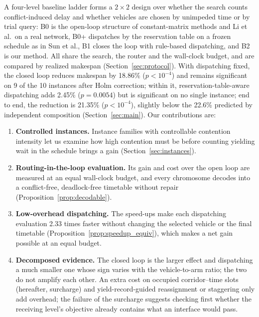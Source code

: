 \documentclass[preprint,review,12pt,authoryear,doubleblind]{elsarticle}
\newcommand{\NCases}{10}
\newcommand{\GainLoopRule}{18.86\%}      %
\newcommand{\PLoopRule}{<10^{-4}}
\newcommand{\GainProbeLoop}{2.45\%}      %
\newcommand{\PProbeLoop}{=0.0054}
\newcommand{\GainEndToEnd}{21.35\%}      %
\newcommand{\PEndToEnd}{<10^{-4}}
\newcommand{\GainIndepProduct}{22.6\%}
\newcommand{\CellsSigLoopAdj}{9}
\newcommand{\SpeedupProbe}{2.33}
\begin{document}
A four-level baseline ladder forms a $2\times2$ design over whether the search counts conflict-induced delay and whether vehicles are chosen by unimpeded time or by trial query: B0 is the open-loop structure of constant-matrix methods and Li et al.\ on a real network, B0+ dispatches by the reservation table on a frozen schedule as in Sun et al., B1 closes the loop with rule-based dispatching, and B2 is our method.
All share the search, the router and the wall-clock budget, and are compared by realized makespan (Section~\ref{sec:protocol}).
With dispatching fixed, the closed loop reduces makespan by \GainLoopRule{} ($p\PLoopRule$) and remains significant on \CellsSigLoopAdj{} of the \NCases{} instances after Holm correction; within it, reservation-table-aware dispatching adds \GainProbeLoop{} ($p\PProbeLoop$) but is significant on no single instance; end to end, the reduction is \GainEndToEnd{} ($p\PEndToEnd$), slightly below the \GainIndepProduct{} predicted by independent composition (Section~\ref{sec:main}).
Our contributions are:

\begin{enumerate}[leftmargin=*]
\item \textbf{Controlled instances.} Instance families with controllable contention intensity let us examine how high contention must be before counting yielding wait in the schedule brings a gain (Section~\ref{sec:instances}).
\item \textbf{Routing-in-the-loop evaluation.} Its gain and cost over the open loop are measured at an equal wall-clock budget, and every chromosome decodes into a conflict-free, deadlock-free timetable without repair (Proposition~\ref{prop:decodable}).
\item \textbf{Low-overhead dispatching.} The speed-ups make each dispatching evaluation \SpeedupProbe{} times faster without changing the selected vehicle or the final timetable (Proposition~\ref{prop:speedup_equiv}), which makes a net gain possible at an equal budget.
\item \textbf{Decomposed evidence.} The closed loop is the larger effect and dispatching a much smaller one whose sign varies with the vehicle-to-arm ratio; the two do not amplify each other. An extra cost on occupied corridor--time slots (hereafter, surcharge) and yield-record-guided reassignment or staggering only add overhead; the failure of the surcharge suggests checking first whether the receiving level's objective already contains what an interface would pass.
\end{enumerate}
\end{document}
